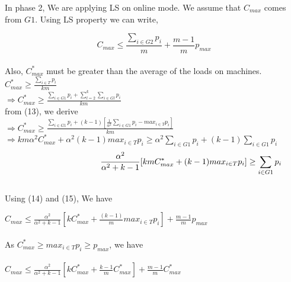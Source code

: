 \documentclass[10pt, conference, compsocconf]{IEEEtran}
\begin{document}
In phase 2, We are applying LS on online mode. We assume that $C_{max}$ comes from $G1$. Using LS property we can write,

\begin{equation}
 C_{max} \leq \frac{\sum_{i \in G2 }^{}{{p_{i}}}}{m} + {\frac{m-1}{m}} p_{max} 
\end{equation}
\\

Also, $C_{max}^{*}$ must be greater than the average of the  loads on  machines.\\

\hspace*{90pt}$C_{max}^{*} \geq  \frac{\sum_{i \in T }^{}{{p_{i}}}}{km}$\\

\hspace*{90pt}$\Rightarrow C_{max}^{*} \geq  \frac{\sum_{i \in G1 }^{}{{p_{i}}}+ \sum_{l=2}^{k}\sum_{i \in Gl }^{}{{p_{i}}}}{km}$\\




from (13), we derive\\
\hspace*{90pt}$\Rightarrow C_{max}^{*} \geq  \frac{\sum_{i \in G1 }^{}{{p_{i}}}+ (k-1)[\frac{1}{\alpha^{2}}\sum_{i \in G1 }^{}{{p_{i}}}-  {max_{i \in T}}{{p_{i}}}]}{km}$\\

\hspace*{90pt}$\Rightarrow km\alpha^{2}C_{max}^{*} + \alpha^{2} (k-1){max_{i \in T}}{{p_{i}}} \geq  \alpha^{2}\sum_{i \in G1 }^{}{{p_{i}}}+ (k-1)\sum_{i \in G1 }^{}{{p_{i}}} $\\



\begin{equation}
\hspace*{90pt}\frac{\alpha^{2}}{\alpha^{2}+k-1}[km C_{max}^{*}+(k-1) {max_{i \in T}}{{p_{i}}}] \geq \sum_{i \in G1 }^{}{{p_{i}}}  
\end{equation}
\\
Using (14) and (15), We have

\hspace*{90pt} $C_{max} \leq \frac{\alpha^{2}}{\alpha^{2}+k-1}[k C_{max}^{*}+\frac{(k-1)}{m} {max_{i \in T}}{{p_{i}}}] + {\frac{m-1}{m}} p_{max} $ \\
\\
 As $C_{max}^{*}\geq {{max_{i \in T}}{p_{i}}}\geq p_{max}$, we have\\
\\
 \hspace*{90pt} $C_{max} \leq \frac{\alpha^{2}}{\alpha^{2}+k-1}[k C_{max}^{*}+ {\frac{k-1}{m}}{C_{max}^{*}}] + {\frac{m-1}{m}} C_{max}^{*} $ \\
 
\end{document}

